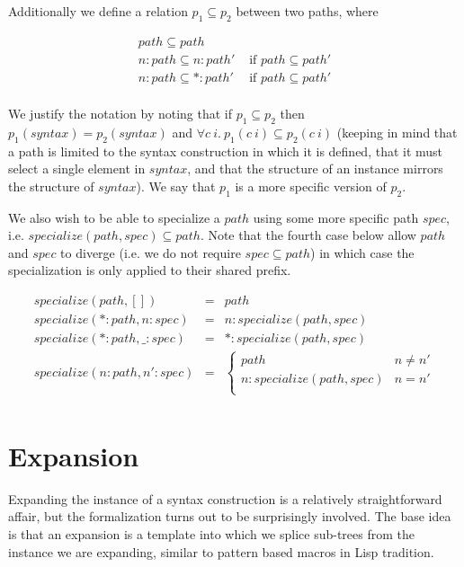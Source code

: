 \documentclass{kththesis}
\begin{document}
Additionally we define a relation $p_1 \subseteq p_2$ between two paths, where

$$
\begin{array}{ll}
path \subseteq path & \\
n : path \subseteq n : path' & \text{ if } path \subseteq path' \\
n : path \subseteq * : path' & \text{ if } path \subseteq path' \\
\end{array}
$$

We justify the notation by noting that if $p_1 \subseteq p_2$ then $p_1(syntax) = p_2(syntax)$ and $\forall c~i.\ p_1(c~i) \subseteq p_2(c~i)$ (keeping in mind that a path is limited to the syntax construction in which it is defined, that it must select a single  element in $syntax$, and that the structure of an instance mirrors the structure of $syntax$). We say that $p_1$ is a more specific version of $p_2$.

We also wish to be able to specialize a $path$ using some more specific path $spec$, i.e. $specialize(path, spec) \subseteq path$. Note that the fourth case below allow $path$ and $spec$ to diverge (i.e. we do not require $spec \subseteq path$) in which case the specialization is only applied to their shared prefix.

$$
\begin{array}{rcl}
specialize(path, []) & = & path \\
specialize(*:path, n:spec) & = & n : specialize(path, spec) \\
specialize(*:path, \_:spec) & = & * : specialize(path, spec) \\
specialize(n:path, n':spec) & = &
\begin{cases}
  path & n \neq n' \\
  n : specialize(path, spec) & n = n' \\
\end{cases} \\
\end{array}
$$

\section{Expansion} \label{sec:expansion-formalization}

Expanding the instance of a syntax construction is a relatively straightforward affair, but the formalization turns out to be surprisingly involved. The base idea is that an expansion is a template into which we splice sub-trees from the instance we are expanding, similar to pattern based macros in Lisp tradition.
\end{document}
